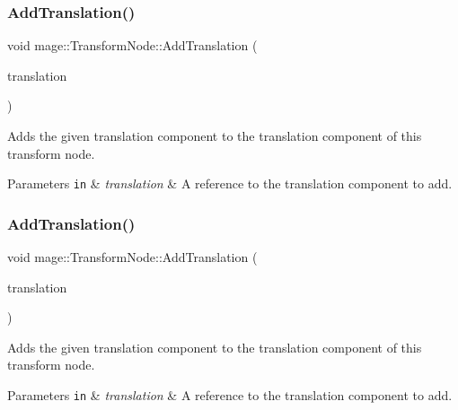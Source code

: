 \subsubsection{\texorpdfstring{Add\+Translation()}{AddTranslation()}\hspace{0.1cm}{\footnotesize\ttfamily [2/3]}}
{\footnotesize\ttfamily void mage\+::\+Transform\+Node\+::\+Add\+Translation (\begin{DoxyParamCaption}\item[{const X\+M\+F\+L\+O\+A\+T3 \&}]{translation }\end{DoxyParamCaption})}

Adds the given translation component to the translation component of this transform node.


\begin{DoxyParams}[1]{Parameters}
\mbox{\tt in}  & {\em translation} & A reference to the translation component to add. \\
\hline
\end{DoxyParams}
\hypertarget{classmage_1_1_transform_node_ae2f57eb9e02583900f865e80040279b4}{}\label{classmage_1_1_transform_node_ae2f57eb9e02583900f865e80040279b4} 
\subsubsection{\texorpdfstring{Add\+Translation()}{AddTranslation()}\hspace{0.1cm}{\footnotesize\ttfamily [3/3]}}
{\footnotesize\ttfamily void mage\+::\+Transform\+Node\+::\+Add\+Translation (\begin{DoxyParamCaption}\item[{const X\+M\+V\+E\+C\+T\+OR \&}]{translation }\end{DoxyParamCaption})}

Adds the given translation component to the translation component of this transform node.


\begin{DoxyParams}[1]{Parameters}
\mbox{\tt in}  & {\em translation} & A reference to the translation component to add. \\
\hline
\end{DoxyParams}
\hypertarget{classmage_1_1_transform_node_a16f2077647c4a0f7f1f27e11ba7dbf37}{}\label{classmage_1_1_transform_node_a16f2077647c4a0f7f1f27e11ba7dbf37} 
